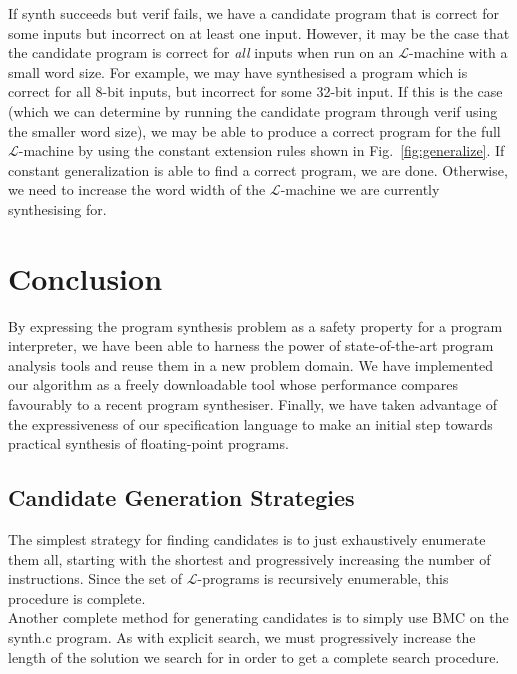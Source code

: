 \documentclass[preprint]{sigplanconf}
\theoremstyle{definition}
\begin{document}
If {\sc synth} succeeds but {\sc verif} fails, we have a candidate
program that is correct for some inputs but incorrect on at least
one input.  However, it may be the case that the candidate program
is correct for \emph{all} inputs when run on an $\mathcal{L}$-machine
with a small word size.  For example, we may have synthesised a
program which is correct for all 8-bit inputs, but incorrect for
some 32-bit input.  If this is the case (which we can determine
by running the candidate program through {\sc verif} using the smaller
word size), we may be able to produce a correct program for
the full $\mathcal{L}$-machine by using the constant extension rules
shown in Fig.~\ref{fig:generalize}.  If constant generalization
is able to find a correct program, we are done.  Otherwise,
we need to increase the word width of the $\mathcal{L}$-machine
we are currently synthesising for.


\section{Conclusion}

By expressing the program synthesis problem as a safety property for a
program interpreter, we have been able to harness the power of
state-of-the-art program analysis tools and reuse them in a new problem
domain.  We have implemented our algorithm as a freely downloadable tool
whose performance compares favourably to a recent program synthesiser. 
Finally, we have taken advantage of the expressiveness of our specification
language to make an initial step towards practical synthesis of
floating-point programs.

\fi

\subsection{Candidate Generation Strategies}
 The simplest strategy for finding candidates
is to just exhaustively enumerate them all, starting with the shortest and
progressively increasing the number of instructions.  Since the set of
$\mathcal{L}$-programs is recursively enumerable, this procedure is complete.
\\

 Another complete method for generating
candidates is to simply use BMC on the {\sc synth.c} program.  As with explicit
search, we must progressively increase the length of the solution we search for
in order to get a complete search procedure.
\\
\end{document}
